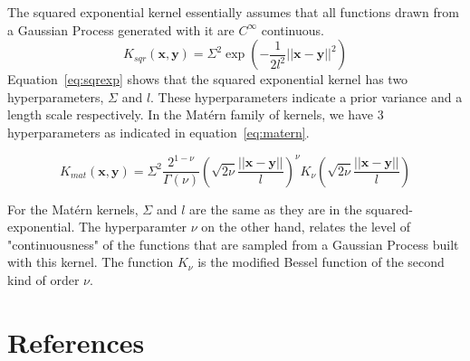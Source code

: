 \documentclass{article}%
\begin{document}
The squared exponential kernel essentially assumes that all functions drawn from a Gaussian Process generated with it 
are $C^\infty$ continuous.  
\begin{equation}
K_{sqr}(\mathbf{x}, \mathbf{y}) = \Sigma^2 \exp{\left(-\frac{1}{2l^2}||\mathbf{x} - \mathbf{y}||^2\right)}
\label{eq:sqrexp}
\end{equation}
Equation~\ref{eq:sqrexp} shows that the squared exponential kernel has two hyperparameters, $\Sigma$ and 
$l$. These hyperparameters indicate a prior variance and a length scale respectively. In the Mat\'{e}rn 
family of kernels, we have 3 hyperparameters as indicated in equation~\ref{eq:matern}.

\begin{equation}
K_{mat}(\mathbf{x}, \mathbf{y}) = \Sigma^2 \frac{2^{1-\nu}}{\Gamma(\nu)}\left(\sqrt{2\nu}
\frac{||\mathbf{x} - \mathbf{y}||}{l}\right)^\nu K_{\nu} \left(\sqrt{2\nu}
\frac{||\mathbf{x} - \mathbf{y}||}{l}\right)
\label{eq:matern}
\end{equation}

For the Mat\'{e}rn kernels, $\Sigma$ and $l$ are the same as they are in the squared-exponential. The 
hyperparamter $\nu$ on the other hand, relates the level of "continuousness" of the functions that are 
sampled from a Gaussian Process built with this kernel. The function $K_\nu$ is the modified Bessel 
function of the second kind of order $\nu$. 




\newpage

\section*{References}
\label{sec:references}


\end{document}
